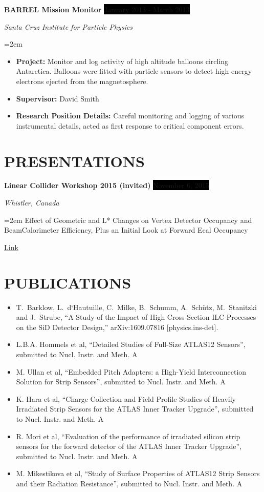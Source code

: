 \documentclass[paper=a4,fontsize=11pt]{scrartcl} %
\newcommand{\sepspace}{\vspace*{1em}}		%
\newcommand{\NewPart}[1]{\section*{\uppercase{#1}}}
\newcommand{\EducationEntry}[4]{
		\noindent \textbf{#1} \hfill      %
		\colorbox{Black}{%
			\parbox{6em}{%
			\hfill\color{White}#2}} \par  %
		\noindent \textit{#3} \par        %
		\noindent\hangindent=2em\hangafter=0 \small #4 %
		\normalsize \par}
\newcommand{\WorkEntry}[4]{				  %
		\noindent \textbf{#1} \hfill      %
		\colorbox{Black}{\color{White}#2} \par  %
		\noindent \textit{#3} \par              %
		\noindent\hangindent=2em\hangafter=0 \small #4 %
		\normalsize \par}
\begin{document}
    \WorkEntry {BARREL Mission Monitor}
        {January 2013 - March 2013}
        {Santa Cruz Institute for Particle Physics}
        {\begin{itemize}
            \item[] \textbf{Project:}
                Monitor and log activity of high altitude balloons circling Antarctica.
                Balloons were fitted with particle sensors to detect high energy electrons
                ejected from the magnetosphere.
            \item[] \textbf{Supervisor:}
                David Smith
            \item[] \textbf{Research Position Details:}
                Careful monitoring and logging of various instrumental details,
                acted as first response to critical component errors.
        \end{itemize}}
    \sepspace


\NewPart{Presentations}{}
    \WorkEntry {Linear Collider Workshop 2015 (invited)} 
        {November 6, 2015}
        {Whistler, Canada}
        {Effect of Geometric and L* Changes on Vertex Detector Occupancy
        and BeamCalorimeter Efficiency, Plus an Initial Look at Forward Ecal
        Occupancy

        \href{https://agenda.linearcollider.org/event/6662/session/39/contribution/205/material/slides/0.pdf} {\underline{Link}}
        }


\NewPart{Publications}
    \begin{itemize}
        \item[] T.~Barklow, L.~d`Hautuille, C.~Milke, B.~Schumm, A.~Schütz, M.~Stanitzki and J.~Strube,
            ``A Study of the Impact of High Cross Section ILC Processes on the SiD Detector Design,''
              arXiv:1609.07816 [physics.ins-det].
        \item[] L.B.A. Hommels et al, ``Detailed Studies of Full-Size ATLAS12 Sensors'', submitted to Nucl. Instr. and Meth. A
        \item[] M. Ullan et al, ``Embedded Pitch Adapters: a High-Yield Interconnection Solution for Strip Sensors'', submitted to Nucl. Instr. and Meth. A
        \item[] K. Hara et al, ``Charge Collection and Field Profile Studies of Heavily Irradiated Strip Sensors for the ATLAS Inner Tracker Upgrade'', submitted to Nucl. Instr. and Meth. A
        \item[] R. Mori et al, ``Evaluation of the performance of irradiated silicon strip sensors for the forward detector of the ATLAS Inner Tracker Upgrade'', submitted to Nucl. Instr. and Meth. A
        \item[] M. Mikestikova et al, ``Study of Surface Properties of ATLAS12 Strip Sensors and their Radiation Resistance'', submitted to Nucl. Instr. and Meth. A
    \end{itemize}
\end{document}
